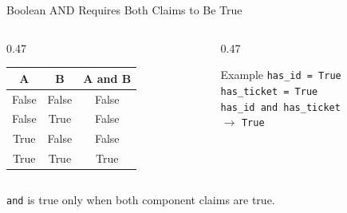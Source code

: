 \documentclass[aspectratio=169,10pt]{beamer}
\begin{document}
\begin{frame}{Boolean AND Requires Both Claims to Be True}
  \begin{columns}[T,onlytextwidth]
    \begin{column}{0.47\textwidth}
      \begin{center}
        \renewcommand{\arraystretch}{1.25}
        \begin{tabular}{c|c|c}
          \textbf{A} & \textbf{B} & \textbf{A and B} \\\hline
          False & False & False \\
          False & True & False \\
          True & False & False \\
          True & True & True
        \end{tabular}
      \end{center}
    \end{column}

    \begin{column}{0.47\textwidth}
      \begin{block}{Example}
        \texttt{has\_id = True}\\
        \texttt{has\_ticket = True}\\[0.08in]
        \texttt{has\_id and has\_ticket}\\[0.08in]
        $\longrightarrow$ \texttt{True}
      \end{block}
    \end{column}
  \end{columns}

  \begin{keyidea}
    \texttt{and} is true only when both component claims are true.
  \end{keyidea}
\end{frame}
\end{document}
